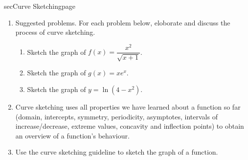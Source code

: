 \documentclass[../main]{subfiles}
\begin{document}
\begin{outline}{sec}{Curve Sketching}{page}
\begin{enumerate}
    \item Suggested problems. For each problem below, eloborate and discuss the process of curve sketching.
      \begin{enumerate}
        \item Sketch the graph of \(f(x) = \dfrac{x^{2}}{\sqrt{x + 1}}\).
        \item Sketch the graph of \(g(x) = x e^{x}\).
        \item Sketch the graph of \(y = \ln(4 - x^{2})\).
      \end{enumerate}
      
    \item {Curve sketching uses all properties we have learned about a function so far (domain, intercepts, symmetry, periodicity, asymptotes, intervals of increase/decrease, extreme values, concavity and inflection points) to obtain an overview of a function's behaviour.}
    \item {Use the curve sketching guideline to sketch the graph of a function.}
\end{enumerate}
\end{outline}
\end{document}
